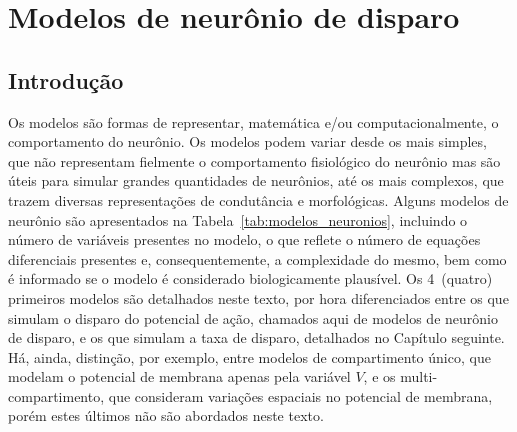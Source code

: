 \chapter{Modelos de neurônio de disparo}\label{cap:modelos}
\section{Introdução}\label{sec:modelos_intro}
Os modelos são formas de representar, matemática e/ou computacionalmente, o comportamento do neurônio. Os modelos podem variar desde os mais simples, que não representam fielmente o comportamento fisiológico do neurônio mas são úteis para simular grandes quantidades de neurônios, até os mais complexos, que trazem diversas representações de condutância e morfológicas. Alguns modelos de neurônio são apresentados na Tabela~\ref{tab:modelos_neuronios}, incluindo o número de variáveis presentes no modelo, o que reflete o número de equações diferenciais presentes e, consequentemente, a complexidade do mesmo, bem como é informado se o modelo é considerado biologicamente plausível. Os 4~(quatro) primeiros modelos são detalhados neste texto, por hora diferenciados entre os que simulam o disparo do potencial de ação, chamados aqui de modelos de neurônio de disparo, e os que simulam a taxa de disparo, detalhados no Capítulo seguinte. Há, ainda, distinção, por exemplo, entre modelos de compartimento único, que modelam o potencial de membrana apenas pela variável $V$, e os multi-compartimento, que consideram variações espaciais no potencial de membrana, porém estes últimos não são abordados neste texto.

\begin{table}
\end{table}

